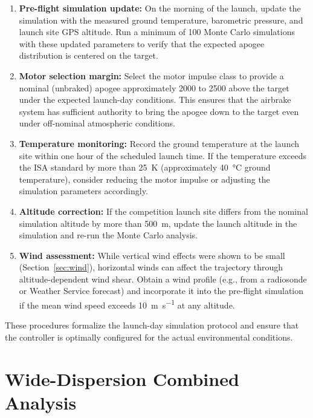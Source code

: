 \documentclass[11pt,letterpaper]{article}
\begin{document}
\begin{enumerate}[nosep]
    \item \textbf{Pre-flight simulation update:} On the morning of the launch, update the simulation with the measured ground temperature, barometric pressure, and launch site GPS altitude. Run a minimum of 100 Monte Carlo simulations with these updated parameters to verify that the expected apogee distribution is centered on the target.

    \item \textbf{Motor selection margin:} Select the motor impulse class to provide a nominal (unbraked) apogee approximately \SI{2000}{\ft} to \SI{2500}{\ft} above the target under the expected launch-day conditions. This ensures that the airbrake system has sufficient authority to bring the apogee down to the target even under off-nominal atmospheric conditions.

    \item \textbf{Temperature monitoring:} Record the ground temperature at the launch site within one hour of the scheduled launch time. If the temperature exceeds the ISA standard by more than \SI{25}{\kelvin} (approximately \SI{40}{\celsius} ground temperature), consider reducing the motor impulse or adjusting the simulation parameters accordingly.

    \item \textbf{Altitude correction:} If the competition launch site differs from the nominal simulation altitude by more than \SI{500}{\metre}, update the launch altitude in the simulation and re-run the Monte Carlo analysis.

    \item \textbf{Wind assessment:} While vertical wind effects were shown to be small (Section~\ref{sec:wind}), horizontal winds can affect the trajectory through altitude-dependent wind shear. Obtain a wind profile (e.g., from a radiosonde or Weather Service forecast) and incorporate it into the pre-flight simulation if the mean wind speed exceeds \SI{10}{\metre\per\second} at any altitude.
\end{enumerate}

These procedures formalize the launch-day simulation protocol and ensure that the controller is optimally configured for the actual environmental conditions.


\section{Wide-Dispersion Combined Analysis}
\label{sec:worstcase}
\end{document}
